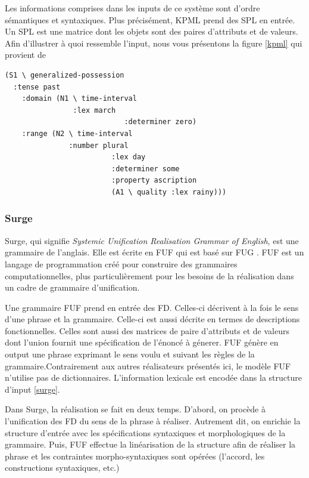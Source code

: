 Les informations comprises dans les inputs de ce système sont d'ordre sémantiques et syntaxiques. Plus précisément, KPML prend des \acf{SPL} en entrée. Un \ac{SPL} est une matrice dont les objets sont des paires d'attributs et de valeurs. Afin d'illustrer à quoi ressemble l'input, nous vous présentons la figure \ref{kpml} qui provient de \cite{ReiterBuildingNaturalLanguage2000} 
\begin{lstlisting}[language=Xml, caption=SPL: input de KPML, label=kpml]
(S1 \ generalized-possession
  :tense past 
	:domain (N1 \ time-interval
	            :lex march
							:determiner zero)
	:range (N2 \ time-interval
	           :number plural
						 :lex day
						 :determiner some
						 :property ascription
						 (A1 \ quality :lex rainy)))
\end{lstlisting}

\subsubsection{Surge}
Surge, qui signifie \emph{Systemic Unification Realisation Grammar of English}, est une grammaire de l'anglais\citep{Elhadad98surge:a}. Elle est écrite en \acf{FUF} qui est basé sur \acf{FUG} \citep{KayFunctionalUnificationGrammar1984}. \ac{FUF} est un langage de programmation créé pour construire des grammaires computationnelles, plus particulièrement pour les besoins de la réalisation dans un cadre de grammaire d'unification. 

Une grammaire \ac{FUF} prend en entrée des \acf{FD}. Celles-ci décrivent à la fois le sens d'une phrase et la grammaire. Celle-ci est aussi décrite en termes de descriptions fonctionnelles. Celles sont aussi des matrices de paire d'attributs et de valeurs dont l'union fournit une spécification de l'énoncé à génerer. \ac{FUF} génère en output une phrase exprimant le sens voulu et suivant les règles de la grammaire.Contrairement aux autres réalisateurs présentés ici, le modèle \ac{FUF} n'utilise pas de dictionnaires. L'information lexicale est encodée dans la structure d'input \ref{surge}.

Dans Surge, la réalisation se fait en deux temps. D'abord, on procède à l'unification des \ac{FD} du sens de la phrase à réaliser. Autrement dit, on enrichie la structure d’entrée avec les spécifications syntaxiques et morphologiques de la grammaire. Puis, \ac{FUF} effectue la linéarisation de la structure afin de réaliser la phrase et les contraintes morpho-syntaxiques sont opérées (l'accord, les constructions syntaxiques, etc.)

